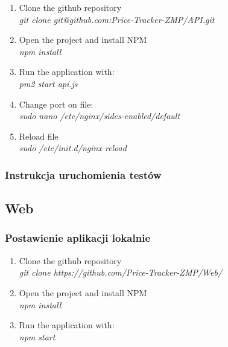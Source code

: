 \documentclass{article}
\begin{document}
        \begin{enumerate}
            \item Clone the github repository\\
                \emph{git clone git@github.com:Price-Tracker-ZMP/API.git} \\
            \item Open the project and install NPM\\
              \emph{npm install} \\
            \item Run the application with:\\
                \emph{pm2 start api.js} \\
            \item Change port on file:\\
                \emph{sudo nano /etc/nginx/sides-enabled/default} \\
            \item Reload file\\
                \emph{sudo /etc/init.d/nginx reload} \\
        \end{enumerate}
        
        \subsubsection{Instrukcja uruchomienia testów}
        
    \subsection{Web}
        \subsubsection{Postawienie aplikacji lokalnie}
        \begin{enumerate}
            \item Clone the github repository\\
                        \emph{git clone https://github.com/Price-Tracker-ZMP/Web/} \\
            \item Open the project and install NPM\\
              \emph{npm install} \\
            \item Run the application with:\\
                \emph{npm start} \\
        \end{enumerate}
        
\end{document}
